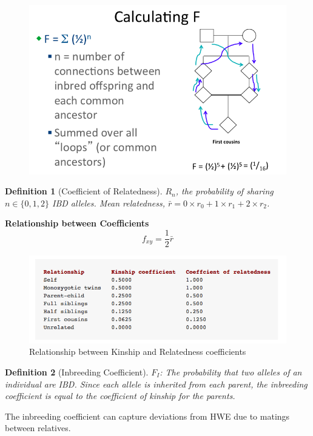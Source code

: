 \documentclass{tufte-handout}
\theoremstyle{noparens}
\newtheorem*{define}{Definition}
\begin{document}
\begin{figure}[h]
\includegraphics[scale=0.5]{./figs/kincoeff}
\end{figure}

\begin{define}[Coefficient of Relatedness]
$R_n$, the probability of sharing $n \in \{0,1,2\}$ IBD alleles. Mean relatedness, $\bar{r} = 0 \times r_0 + 1 \times r_1 + 2 \times r_2$.
\end{define}

\noindent
\textbf{Relationship between Coefficients}
\[f_{xy} = \frac{1}{2}\bar{r}\]
\begin{figure}[H]
\includegraphics[scale=0.5]{./figs/kinrelate}
\caption{Relationship between Kinship and Relatedness coefficients}
\end{figure}

\begin{define}[Inbreeding Coefficient]
	$F_I$: The probability that two alleles of an individual are IBD. Since each allele is inherited from each parent, the inbreeding coefficient is equal to the coefficient of kinship for the parents. 
\end{define}

The inbreeding coefficient can capture deviations from HWE due to matings between relatives.
\end{document}
